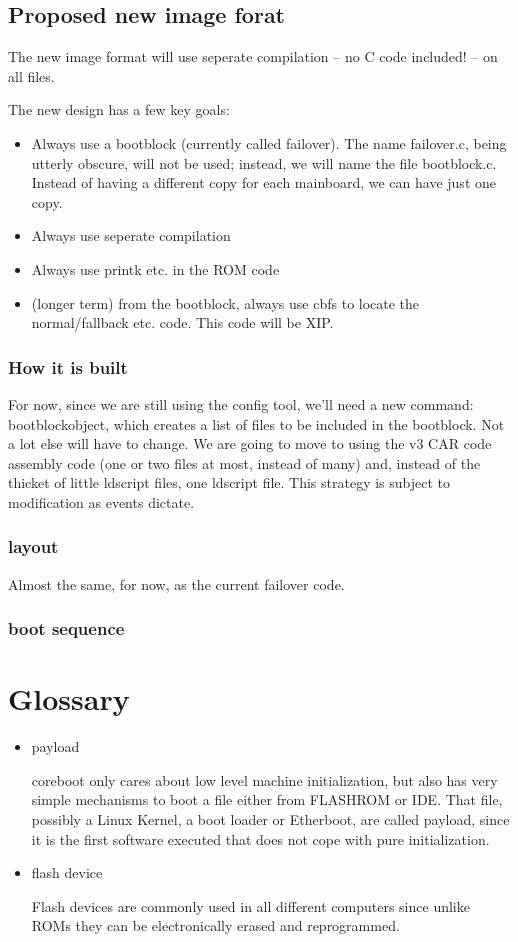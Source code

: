 \documentclass[titlepage,12pt]{article}
\begin{document}
\subsection{Proposed new image forat}
The new image format will use seperate compilation -- no C code included! -- on all files. 

The new design has a few key goals: 
\begin{itemize}
\item Always use a bootblock (currently called failover). 
The name failover.c, being utterly obscure, will not be used; instead, we will name the file bootblock.c. Instead of having a different copy for each mainboard, we can have just one copy. 
\item Always use seperate compilation
\item Always use printk etc. in the ROM code
\item (longer term) from the bootblock, always use cbfs to locate the normal/fallback etc. code. This code will be XIP. 
\end{itemize}

\subsubsection{How it is built}
For now, since we are still using the config tool, we'll need a new command: bootblockobject, which creates a list of files to be included in the bootblock.   Not a lot else will have to change. We are going to move to using the v3 CAR code assembly code (one or two files at most, instead of many) and, instead of the thicket of little ldscript files, one ldscript file. This strategy is subject to modification as events dictate. 
\subsubsection{layout}
Almost the same, for now, as the current failover code. 
\subsubsection{boot sequence}
%
%

\section{Glossary}
\begin{itemize}
\item payload

coreboot only cares about low level machine initialization, but also has
very simple mechanisms to boot a file either from FLASHROM or IDE. That
file, possibly a Linux Kernel, a boot loader or Etherboot, are called
payload, since it is the first software executed that does not cope with
pure initialization.

\item flash device

Flash devices are commonly used in all different computers since unlike
ROMs they can be electronically erased and reprogrammed.
\end{itemize}
\end{document}
